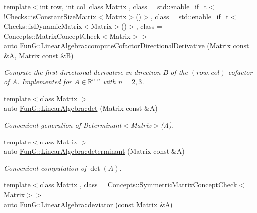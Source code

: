 \begin{DoxyCompactItemize}
{\footnotesize template$<$int row, int col, class Matrix , class  = std\-::enable\-\_\-if\-\_\-t$<$!\-Checks\-::is\-Constant\-Size\-Matrix$<$\-Matrix$>$()$>$, class  = std\-::enable\-\_\-if\-\_\-t$<$\-Checks\-::is\-Dynamic\-Matrix$<$\-Matrix$>$()$>$, class  = Concepts\-::\-Matrix\-Concept\-Check$<$\-Matrix$>$$>$ }\\auto \hyperlink{group__LinearAlgebraGroup_ga5ecd9444a4fae625924476d5a0b4cd5a}{Fun\-G\-::\-Linear\-Algebra\-::compute\-Cofactor\-Directional\-Derivative} (Matrix const \&A, Matrix const \&B)
\begin{DoxyCompactList}\small\item\em Compute the first directional derivative in direction $ B $ of the $(row,col)$-\/cofactor of $ A $. Implemented for $ A\in \mathbb{R}^{n,n} $ with $ n=2,3 $. \end{DoxyCompactList}\item 
\hypertarget{group__LinearAlgebraGroup_ga60c35602004bd0efea873eef25fe3329}{{\footnotesize template$<$class Matrix $>$ }\\auto \hyperlink{group__LinearAlgebraGroup_ga60c35602004bd0efea873eef25fe3329}{Fun\-G\-::\-Linear\-Algebra\-::det} (Matrix const \&A)}\label{group__LinearAlgebraGroup_ga60c35602004bd0efea873eef25fe3329}

\begin{DoxyCompactList}\small\item\em Convenient generation of Determinant$<$\-Matrix$>$(\-A). \end{DoxyCompactList}\item 
\hypertarget{group__LinearAlgebraGroup_ga30718cf55a6e699fc1da34ff9fdfcf88}{{\footnotesize template$<$class Matrix $>$ }\\auto \hyperlink{group__LinearAlgebraGroup_ga30718cf55a6e699fc1da34ff9fdfcf88}{Fun\-G\-::\-Linear\-Algebra\-::determinant} (Matrix const \&A)}\label{group__LinearAlgebraGroup_ga30718cf55a6e699fc1da34ff9fdfcf88}

\begin{DoxyCompactList}\small\item\em Convenient computation of $\det(A)$. \end{DoxyCompactList}\item 
\hypertarget{group__LinearAlgebraGroup_ga4cdd9ff379199d332323884f4c7db035}{{\footnotesize template$<$class Matrix , class  = Concepts\-::\-Symmetric\-Matrix\-Concept\-Check$<$\-Matrix$>$$>$ }\\auto \hyperlink{group__LinearAlgebraGroup_ga4cdd9ff379199d332323884f4c7db035}{Fun\-G\-::\-Linear\-Algebra\-::deviator} (const Matrix \&A)}\label{group__LinearAlgebraGroup_ga4cdd9ff379199d332323884f4c7db035}


\end{DoxyCompactItemize}
